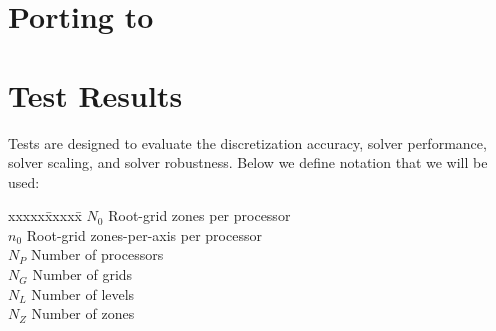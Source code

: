 \documentclass[10pt]{article}
\begin{document}
% 


\section{Porting to \enzo}

\section{Test Results} \label{s:results}

Tests are designed to evaluate the discretization accuracy, solver
performance, solver scaling, and solver robustness.  Below we define
notation that we will be used:

\begin{tabbing}
xxxxx\=xxxxx\=\kill
\> $N_0$ \> Root-grid zones per processor \\
\> $n_0$ \> Root-grid zones-per-axis  per processor \\
\> $N_P$ \> Number of processors \\
\> $N_G$ \> Number of grids \\
\> $N_L$ \> Number of levels \\
\> $N_Z$ \> Number of zones
\end{tabbing}
\end{document}
